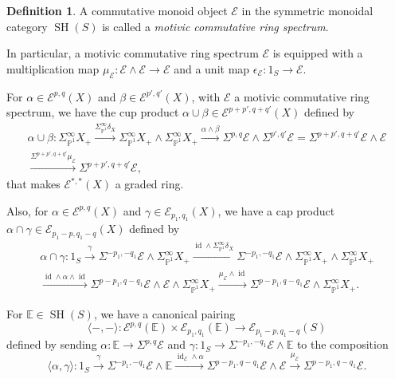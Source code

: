 \documentclass[10pt]{amsart}
\theoremstyle{definition}
\newtheorem{defn}{Definition}[section]
\theoremstyle{plain}
\numberwithin{equation}{section}
\newcommand{\0}{\emptyset}
\newcommand{\sE}{{\mathcal E}}
\newcommand{\E}{{\mathbb E}}
\renewcommand{\P}{{\mathbb P}}
\newcommand{\SH}{{\operatorname{SH}}}
\newcommand{\id}{{\operatorname{id}}}
\begin{document}
\begin{defn}
    A commutative monoid object $\sE$ in the symmetric monoidal category $\SH(S)$ is called a \emph{motivic commutative ring spectrum}.
\end{defn}
In particular, a motivic commutative ring spectrum $\sE$ is equipped with a multiplication map $\mu_{\sE}:\sE \wedge \sE \to \sE$ and a unit map $\epsilon_\sE:1_S \to \sE$.

For $\alpha \in \sE^{p,q}(X)$ and $\beta \in \sE^{p',q'}(X)$, with $\sE$ a motivic commutative ring spectrum, we have the cup product $\alpha \cup \beta \in \sE^{p+p',q+q'}(X)$ defined by
\begin{multline*}
    \alpha \cup \beta:\Sigma_{\P^1}^\infty X_+ \xrightarrow{\Sigma_{\P^1}^\infty \delta_X} \Sigma_{\P^1}^\infty X_+ \wedge \Sigma_{\P^1}^\infty X_+ \xrightarrow{\alpha \wedge \beta} \Sigma^{p,q}\sE \wedge \Sigma^{p',q'}\sE = \Sigma^{p+p',q+q'}\sE \wedge \sE \\
    \xrightarrow{\Sigma^{p+p',q+q'}\mu_\sE} \Sigma^{p+p',q+q'} \sE,
\end{multline*}
that makes $\sE^{*,*}(X)$ a graded ring.

Also, for $\alpha \in \sE^{p,q}(X)$ and $\gamma \in \sE_{p_1,q_1}(X)$, we have a cap product $\alpha \cap \gamma \in \sE_{p_1-p,q_1-q}(X)$ defined by
\begin{multline*}
\alpha \cap \gamma: 1_S \xrightarrow{\gamma} \Sigma^{-p_1,-q_1}\sE \wedge \Sigma_{\P^1}^\infty X_+ 
\xrightarrow{\id\wedge\Sigma_{\P^1}^\infty\delta_X}
\Sigma^{-p_1,-q_1}\sE \wedge \Sigma_{\P^1}^\infty X_+ \wedge\Sigma_{\P^1}^\infty X_+\\ 
\xrightarrow{\id\wedge \alpha\wedge\id}
\Sigma^{p-p_1,q-q_1}\sE \wedge \sE \wedge\Sigma_{\P^1}^\infty X_+ 
\xrightarrow{\mu_\sE\wedge\id}\Sigma^{p-p_1,q-q_1}\sE \wedge\Sigma_{\P^1}^\infty X_+ .
\end{multline*}

For $\E \in \SH(S)$, we have a canonical pairing 
\begin{equation}\label{eqn:Pairing}
\langle -,-\rangle:\sE^{p,q}(\E)\times \sE_{p_1, q_1}(\E)\to \sE_{p_1-p, q_1-q}(S)
\end{equation}
defined by sending $\alpha:\E \to \Sigma^{p,q}\sE$ and $\gamma:1_S\to \Sigma^{-p_1, -q_1}\sE\wedge \E$ to the composition
\[
\langle \alpha,\gamma\rangle: 1_S\xrightarrow{\gamma}\Sigma^{-p_1, -q_1}\sE\wedge \E
\xrightarrow{\id_\sE\wedge\alpha}\Sigma^{p-p_1,q-q_1}\sE\wedge\sE
\xrightarrow{\mu_\sE} \Sigma^{p-p_1,q-q_1}\sE.
\]
\end{document}
